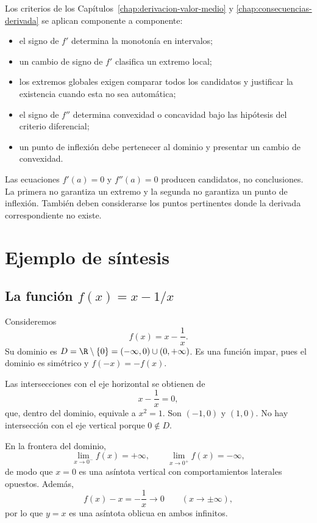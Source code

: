 Los criterios de los Capítulos~\ref{chap:derivacion-valor-medio} y
\ref{chap:consecuencias-derivada} se aplican componente a componente:

\begin{itemize}
  \item el signo de \(f'\) determina la monotonía en intervalos;
  \item un cambio de signo de \(f'\) clasifica un extremo local;
  \item los extremos globales exigen comparar todos los candidatos y
        justificar la existencia cuando esta no sea automática;
  \item el signo de \(f''\) determina convexidad o concavidad bajo las
        hipótesis del criterio diferencial;
  \item un punto de inflexión debe pertenecer al dominio y presentar un
        cambio de convexidad.
\end{itemize}

Las ecuaciones \(f'(a)=0\) y \(f''(a)=0\) producen candidatos, no
conclusiones. La primera no garantiza un extremo y la segunda no garantiza un
punto de inflexión. También deben considerarse los puntos pertinentes donde
la derivada correspondiente no existe.

\section{Ejemplo de síntesis}
\label{sec:ejemplo-sintesis-funcion}

\subsection{La función \(f(x)=x-1/x\)}

Consideremos
\[
  f(x)=x-\frac1x.
\]
Su dominio es \(D=\R\setminus\{0\}=(-\infty,0)\cup(0,+\infty)\). Es una
función impar, pues el dominio es simétrico y \(f(-x)=-f(x)\).

Las intersecciones con el eje horizontal se obtienen de
\[
  x-\frac1x=0,
\]
que, dentro del dominio, equivale a \(x^2=1\). Son \((-1,0)\) y \((1,0)\).
No hay intersección con el eje vertical porque \(0\notin D\).

En la frontera del dominio,
\[
  \lim_{x\to0^-}f(x)=+\infty,
  \qquad
  \lim_{x\to0^+}f(x)=-\infty,
\]
de modo que \(x=0\) es una asíntota vertical con comportamientos laterales
opuestos. Además,
\[
  f(x)-x=-\frac1x\longrightarrow0
  \qquad (x\to\pm\infty),
\]
por lo que \(y=x\) es una asíntota oblicua en ambos infinitos.

